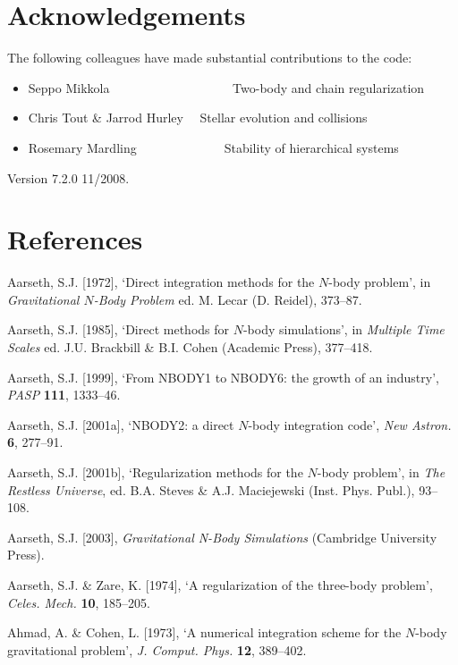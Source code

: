 \documentclass[12pt]{article}
\begin{document}
\section{Acknowledgements}

The following colleagues have made substantial contributions to the code:

\begin{itemize}

\item Seppo Mikkola ~~~~~~~~~~~~~~~~~~~Two-body and chain regularization
\item Chris Tout \& Jarrod Hurley ~~Stellar evolution and collisions
\item Rosemary Mardling~~~~~~~~~~~~~~Stability of hierarchical systems
\end{itemize}

\bigskip
Version 7.2.0 11/2008.

\newpage
\section*{References}

\medskip
\noindent
Aarseth, S.J. [1972], `Direct integration methods for the $N$-body problem',
in {\it Gravitational $N$-Body Problem} ed. M. Lecar (D. Reidel), 373--87.

\medskip
\noindent
Aarseth, S.J. [1985], `Direct methods for $N$-body simulations',
in {\it Multiple Time Scales} ed. J.U. Brackbill \& B.I. Cohen
(Academic Press), 377--418.

\medskip
\noindent
Aarseth, S.J. [1999], `From NBODY1 to NBODY6: the growth of an industry',
{\it PASP} {\bf 111}, 1333--46.

\medskip
\noindent
Aarseth, S.J. [2001a], `NBODY2: a direct $N$-body integration code',
{\it New Astron.} {\bf 6}, 277--91.

\medskip
\noindent
Aarseth, S.J. [2001b], `Regularization methods for the $N$-body problem',
in {\it The Restless Universe}, ed. B.A. Steves \& A.J. Maciejewski
(Inst. Phys. Publ.), 93--108.

\medskip
\noindent
Aarseth, S.J. [2003], {\it Gravitational N-Body Simulations} (Cambridge University Press).

\medskip
\noindent
Aarseth, S.J. \& Zare, K. [1974], `A regularization of the three-body problem',
{\it Celes. Mech.} {\bf 10}, 185--205.

\medskip
\noindent
Ahmad, A. \& Cohen, L. [1973], `A numerical integration scheme for the $N$-body
gravitational problem', {\it J. Comput. Phys.} {\bf 12}, 389--402.
\end{document}
